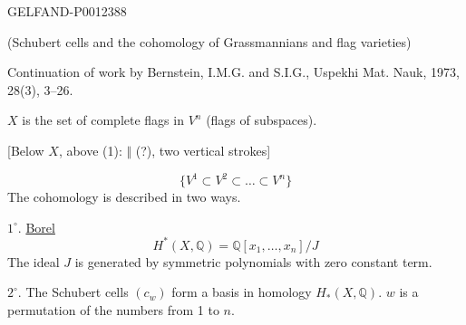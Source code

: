 \begin{GelfandAdjacentEvidence}{GELFAND-P001238}{8}


(Schubert cells and the cohomology of Grassmannians and flag varieties)

Continuation of work by Bernstein, I.M.G. and S.I.G., Uspekhi Mat. Nauk, 1973, 28(3), 3–26.

$X$ is the set of complete flags in $V^n$ (flags of subspaces).

[Below $X$, above (1): $\Vert$ (?), two vertical strokes]
\end{GelfandAdjacentEvidence}

\begin{equation*}
\{V^1\subset V^2\subset\ldots\subset V^n\}
\tag{1}
\end{equation*}
The cohomology is described in two ways.

$1^{\circ}.$ \underline{Borel}
\begin{equation*}
H^*(X,\mathbb Q)=\mathbb Q[x_1,\ldots,x_n]/J
\end{equation*}
The ideal $J$ is generated by symmetric polynomials with zero constant term.

$2^{\circ}.$ The Schubert cells $(c_w)$ form a basis in homology $H_*(X,\mathbb Q)$.
\nopagebreak[4]
$w$ is a permutation of the numbers from 1 to $n$.


